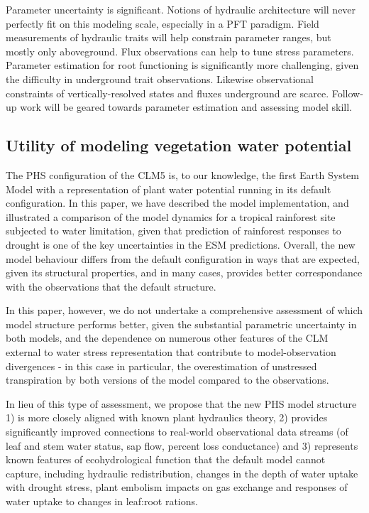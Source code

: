 \documentclass[draft,linenumbers]{agujournal}
\begin{document}
    Parameter uncertainty is significant.
    Notions of hydraulic architecture will never perfectly fit on this modeling scale, especially in a PFT paradigm.
    Field measurements of hydraulic traits will help constrain parameter ranges, but mostly only aboveground.
    Flux observations can help to tune stress parameters.
    Parameter estimation for root functioning is significantly more challenging, given the difficulty in underground trait observations.
    Likewise observational constraints of vertically-resolved states and fluxes underground are scarce.
    Follow-up work will be geared towards parameter estimation and assessing model skill.

\subsection{Utility of modeling vegetation water potential}


    The PHS configuration of the CLM5 is, to our knowledge, the first Earth System Model with a representation of plant water potential running in its default configuration. In this paper, we have described the model implementation, and illustrated a comparison of the model dynamics for a tropical rainforest site subjected to water limitation, given that prediction of rainforest responses to drought is one of the key uncertainties in the ESM predictions. Overall, the new model behaviour differs from the default configuration in ways that are expected, given its structural properties, and in many cases, provides better correspondance with the observations that the default structure. 
    
    In this paper, however, we do not undertake a comprehensive assessment of which model structure performs better, given the substantial parametric uncertainty in both models, and the dependence on numerous other features of the CLM external to water stress representation that contribute to model-observation divergences - in this case in particular, the overestimation of unstressed transpiration by both versions of the model compared to the observations. 
    
    In lieu of this type of assessment, we propose that the new PHS model structure 1) is more closely aligned with known plant hydraulics theory, 2) provides significantly improved connections to real-world observational data streams (of leaf and stem water status, sap flow, percent loss conductance) and 3) represents known features of ecohydrological function that the default model cannot capture, including hydraulic redistribution, changes in the depth of water uptake with drought stress, plant embolism impacts on gas exchange and responses of water uptake to changes in leaf:root rations. 
    
\end{document}
